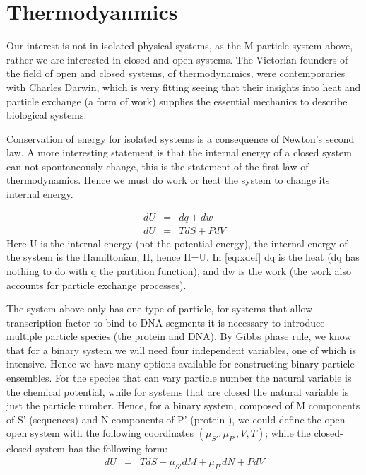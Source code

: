 
\section*{Thermodyanmics}
Our interest is not in isolated physical systems, as the M particle system above, rather we are interested in closed and open systems.  The Victorian founders of the field of open and closed systems, of thermodynamics, were contemporaries with Charles Darwin, which is very fitting seeing that their insights into heat and particle exchange (a form of work) supplies the essential mechanics to describe biological systems.

Conservation of energy for isolated systems is a consequence of Newton's second law. A more interesting statement is that the internal energy of a closed system can not spontaneously change, this is the statement of the first law of thermodynamics.  Hence we must do work or heat the system to change its internal energy. 

\begin{eqnarray}
  dU &=& dq + dw \label{eq:xdef} \\  \nonumber
  dU &=& TdS + PdV
\end{eqnarray}
 Here U is the internal energy (not the potential energy), the internal energy of the system is the Hamiltonian, H, hence H=U.  In \eqref{eq:xdef} dq is the heat (dq has nothing to do with q the partition function), and dw is the work (the work also accounts for particle exchange processes).    
      
 The system above only has one type of particle, for systems that allow transcription factor to bind to DNA segments it is necessary to introduce multiple particle species (the protein and DNA).  By Gibbs phase rule, we know that for a binary system we will need four independent variables, one of which is intensive.  Hence we have many options available for constructing binary particle ensembles.  For the species that can vary particle number the natural variable is the chemical potential, while for systems that are closed the natural variable is just the particle number.  Hence, for a binary system, composed of M components of S' (sequences) and N components of P' (protein ), we could define the open open system with the following coordinates $( \mu_{S'}, \mu_{P'},V,T)$; while the closed-closed system has the following form:
   \begin{eqnarray}
  dU &=& TdS + \mu_{S'} dM + \mu_{P'} dN + PdV
\end{eqnarray}\label{closedclosed} 
%
  
